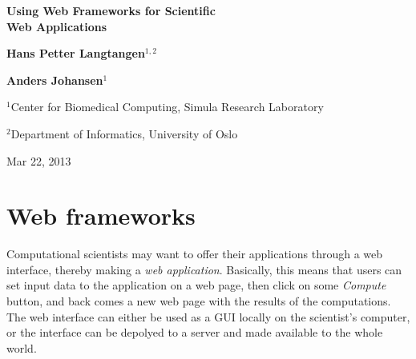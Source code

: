 \documentclass[%
oneside,                 %
final,                   %
10pt]{article}
\begin{document}




\begin{center}
{\LARGE\bf Using Web Frameworks for Scientific \\ [1.5mm] Web Applications}
\end{center}



\begin{center}
{\bf Hans Petter Langtangen${}^{1, 2}$} \\ [0mm]
\end{center}


\begin{center}
{\bf Anders Johansen${}^{1}$} \\ [0mm]
\end{center}

\begin{center}
\centerline{{\small ${}^1$Center for Biomedical Computing, Simula Research Laboratory}}
\centerline{{\small ${}^2$Department of Informatics, University of Oslo}}
\end{center}




\begin{center}
Mar 22, 2013
\end{center}

\vspace{1cm}



\tableofcontents

\vspace{1cm} %






\section{Web frameworks}


Computational scientists may want to offer their applications through
a web interface, thereby making a \emph{web application}.
Basically, this means that users can set input data
to the application on a web page, then click on some \emph{Compute} button,
and back comes a new web page with the results of the computations.
The web interface can either be used as a GUI locally on the
scientist's computer, or the interface can be depolyed to
a server and made available to the whole world.
\end{document}
